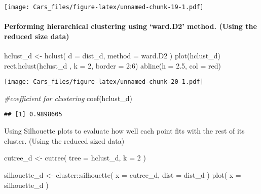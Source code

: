 \documentclass[
]{article}
\newenvironment{Shaded}{\begin{snugshade}}{\end{snugshade}}
\newcommand{\AttributeTok}[1]{\textcolor[rgb]{0.77,0.63,0.00}{#1}}
\newcommand{\CommentTok}[1]{\textcolor[rgb]{0.56,0.35,0.01}{\textit{#1}}}
\newcommand{\DecValTok}[1]{\textcolor[rgb]{0.00,0.00,0.81}{#1}}
\newcommand{\FloatTok}[1]{\textcolor[rgb]{0.00,0.00,0.81}{#1}}
\newcommand{\FunctionTok}[1]{\textcolor[rgb]{0.00,0.00,0.00}{#1}}
\newcommand{\NormalTok}[1]{#1}
\newcommand{\OtherTok}[1]{\textcolor[rgb]{0.56,0.35,0.01}{#1}}
\newcommand{\SpecialCharTok}[1]{\textcolor[rgb]{0.00,0.00,0.00}{#1}}
\newcommand{\StringTok}[1]{\textcolor[rgb]{0.31,0.60,0.02}{#1}}
\begin{document}
\texttt{[image: Cars\_files/figure-latex/unnamed-chunk-19-1.pdf]}

\hypertarget{performing-hierarchical-clustering-using-ward.d2-method.-using-the-reduced-size-data}{%
\paragraph{Performing hierarchical clustering using `ward.D2' method.
(Using the reduced size
data)}\label{performing-hierarchical-clustering-using-ward.d2-method.-using-the-reduced-size-data}}

\begin{Shaded}
\begin{Highlighting}[]
\NormalTok{hclust\_d }\OtherTok{\textless{}{-}} \FunctionTok{hclust}\NormalTok{(}
  \AttributeTok{d =}\NormalTok{ dist\_d,}
  \AttributeTok{method =} \StringTok{\textquotesingle{}ward.D2\textquotesingle{}}
\NormalTok{)}
\FunctionTok{plot}\NormalTok{(hclust\_d)}
\FunctionTok{rect.hclust}\NormalTok{(hclust\_d , }\AttributeTok{k =} \DecValTok{2}\NormalTok{, }\AttributeTok{border =} \DecValTok{2}\SpecialCharTok{:}\DecValTok{6}\NormalTok{)}
\FunctionTok{abline}\NormalTok{(}\AttributeTok{h =} \FloatTok{2.5}\NormalTok{, }\AttributeTok{col =} \StringTok{\textquotesingle{}red\textquotesingle{}}\NormalTok{)}
\end{Highlighting}
\end{Shaded}

\texttt{[image: Cars\_files/figure-latex/unnamed-chunk-20-1.pdf]}

\begin{Shaded}
\begin{Highlighting}[]
\CommentTok{\#coefficient for clustering}
\FunctionTok{coef}\NormalTok{(hclust\_d)}
\end{Highlighting}
\end{Shaded}

\begin{verbatim}
## [1] 0.9898605
\end{verbatim}

Using Silhouette plots to evaluate how well each point fits with the
rest of its cluster. (Using the reduced sized data)

\begin{Shaded}
\begin{Highlighting}[]
\NormalTok{cutree\_d }\OtherTok{\textless{}{-}} \FunctionTok{cutree}\NormalTok{(}
  \AttributeTok{tree =}\NormalTok{ hclust\_d,}
  \AttributeTok{k =} \DecValTok{2}
\NormalTok{)}

\NormalTok{silhouette\_d }\OtherTok{\textless{}{-}}\NormalTok{ cluster}\SpecialCharTok{::}\FunctionTok{silhouette}\NormalTok{(}
  \AttributeTok{x =}\NormalTok{ cutree\_d,}
  \AttributeTok{dist =}\NormalTok{ dist\_d}
\NormalTok{)}
\FunctionTok{plot}\NormalTok{(}
  \AttributeTok{x =}\NormalTok{ silhouette\_d}
\NormalTok{)}
\end{Highlighting}
\end{Shaded}
\end{document}
